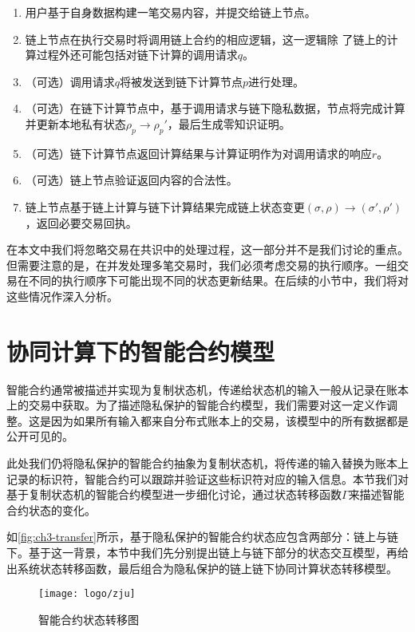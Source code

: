 \begin{enumerate}
    \setlength{\itemsep}{0pt}
    \setlength{\parsep}{0pt}
    \setlength{\parskip}{0pt}
\item 用户基于自身数据构建一笔交易内容，并提交给链上节点。
\item 链上节点在执行交易时将调用链上合约的相应逻辑，这一逻辑除 了链上的计算过程外还可能包括对链下计算的调用请求$\mathit{q}$。
\item （可选）调用请求$\mathit{q}$将被发送到链下计算节点$\mathit{p}$进行处理。
\item （可选）在链下计算节点中，基于调用请求与链下隐私数据，节点将完成计算并更新本地私有状态$\rho_\mathit{p}\rightarrow\rho_\mathit{p}'$，最后生成零知识证明。
\item （可选）链下计算节点返回计算结果与计算证明作为对调用请求的响应$\mathit{r}$。
\item （可选）链上节点验证返回内容的合法性。
\item 链上节点基于链上计算与链下计算结果完成链上状态变更$(\sigma, \rho)\rightarrow(\sigma', \rho')$，返回必要交易回执。
\end{enumerate}

在本文中我们将忽略交易在共识中的处理过程，这一部分并不是我们讨论的重点。但需要注意的是，在并发处理多笔交易时，我们必须考虑交易的执行顺序。一组交易在不同的执行顺序下可能出现不同的状态更新结果。在后续的小节中，我们将对这些情况作深入分析。
\section{协同计算下的智能合约模型}
智能合约通常被描述并实现为复制状态机，传递给状态机的输入一般从记录在账本上的交易中获取。为了描述隐私保护的智能合约模型，我们需要对这一定义作调整。这是因为如果所有输入都来自分布式账本上的交易，该模型中的所有数据都是公开可见的。

此处我们仍将隐私保护的智能合约抽象为复制状态机，将传递的输入替换为账本上记录的标识符，智能合约可以跟踪并验证这些标识符对应的输入信息。本节我们对基于复制状态机的智能合约模型进一步细化讨论，通过状态转移函数$\Gamma$来描述智能合约状态的变化。

如\autoref{fig:ch3-transfer}所示，基于隐私保护的智能合约状态应包含两部分：链上与链下。基于这一背景，本节中我们先分别提出链上与链下部分的状态交互模型，再给出系统状态转移函数，最后组合为隐私保护的链上链下协同计算状态转移模型。

\begin{figure}[htbp]
    \centering
    \texttt{[image: logo/zju]}
    \caption{\label{fig:ch3-transfer}智能合约状态转移图}
\end{figure}


